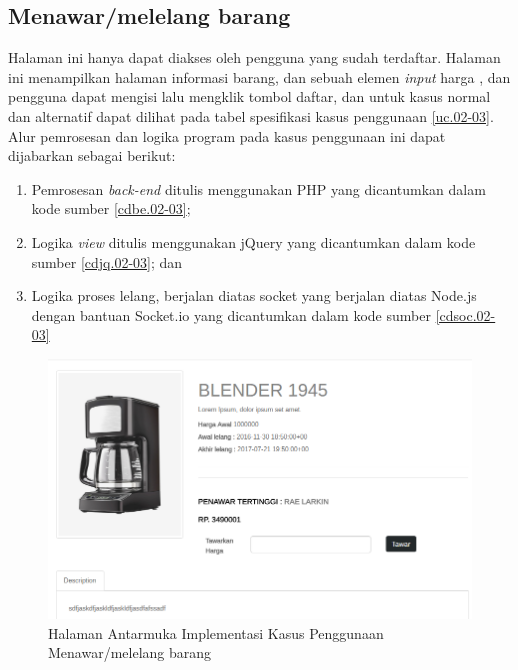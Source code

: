 \subsection{Menawar/melelang barang}
Halaman ini hanya dapat diakses oleh pengguna yang sudah terdaftar. Halaman ini menampilkan halaman informasi barang, dan sebuah elemen \textit{input} harga , dan pengguna dapat mengisi lalu mengklik tombol daftar, dan untuk kasus normal dan alternatif dapat dilihat pada tabel spesifikasi kasus penggunaan \ref{uc.02-03}.\\
\indent Alur pemrosesan dan logika program pada kasus penggunaan ini dapat dijabarkan sebagai berikut:
	\begin{enumerate}
		\item Pemrosesan \textit{back-end} ditulis menggunakan PHP yang dicantumkan dalam kode sumber \ref{cdbe.02-03}; 
		\item Logika \textit{view} ditulis menggunakan jQuery yang dicantumkan dalam kode sumber \ref{cdjq.02-03}; dan
		\item Logika proses lelang, berjalan diatas socket yang berjalan diatas Node.js dengan bantuan Socket.io yang dicantumkan dalam kode sumber \ref{cdsoc.02-03}
	\end{enumerate}

\begin{figure}[H]
    \centering
    \includegraphics[width=\textwidth]{images/bab4/ui/02-03.png}
    \caption{Halaman Antarmuka  Implementasi Kasus Penggunaan Menawar/melelang barang}
    \label{ui.02-03}
\end{figure}

